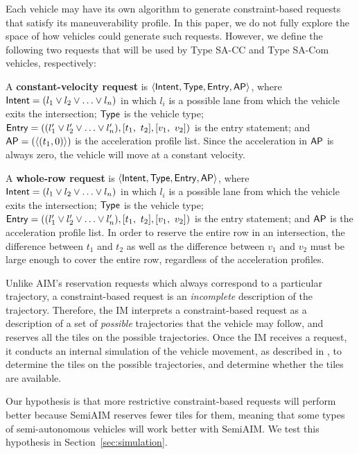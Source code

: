 Each vehicle may have its own algorithm to generate constraint-based
requests that satisfy its maneuverability profile.  In this paper, we
do not fully explore the space of how vehicles could generate such requests.
However, we define the following two requests that will be used by
Type SA-CC and Type SA-Com vehicles, respectively:

\begin{small_ind_s_itemize}
\item A \textbf{constant-velocity request}
is $\langle {\sf Intent}, {\sf Type}, {\sf Entry}, {\sf AP} \rangle$,
where
${\sf Intent} = ( l_1 \vee l_2 \vee \ldots \vee l_n )$
in which $l_i$ is a possible lane from which the vehicle 
exits the intersection;
${\sf Type}$ is the vehicle type;
${\sf Entry} = (( l'_1 \vee l'_2 \vee \ldots \vee l'_n ), [t_1,\ t_2], [v_1,\ v_2])$
is the entry statement; and
${\sf AP} = ( \langle (t_1, 0) \rangle )$
is the acceleration profile list.
Since the acceleration in ${\sf AP}$
is always zero, the vehicle will move at a constant velocity.

\item A \textbf{whole-row request}
is $\langle {\sf Intent}, {\sf Type}, {\sf Entry}, {\sf AP} \rangle$,
where
${\sf Intent} = ( l_1 \vee l_2 \vee \ldots \vee l_n )$
in which $l_i$ is a possible lane from which the vehicle 
exits the intersection;
${\sf Type}$ is the vehicle type;
${\sf Entry} = (( l'_1 \vee l'_2 \vee \ldots \vee l'_n ), [t_1,\ t_2], [v_1,\ v_2])$
is the entry statement; and
${\sf AP}$ is the acceleration profile list.
In order to reserve the entire row in an intersection,
the difference between $t_1$ and $t_2$ 
as well as the difference between $v_1$ and $v_2$
must be large enough to cover the entire row,
regardless of the acceleration profiles.
\end{small_ind_s_itemize}

Unlike AIM's reservation requests which always correspond to a
particular trajectory, a constraint-based request is an
\emph{incomplete} description of the trajectory.  Therefore, the IM
interprets a constraint-based request as a description of a set of
\emph{possible} trajectories that the vehicle may follow, and reserves
all the tiles on the possible trajectories.  Once the IM receives a
request, it conducts an internal simulation of the vehicle
movement, as described in \cite{bib:Dresner08Multiagent}, to determine
the tiles on the possible trajectories, and determine whether the
tiles are available.

Our hypothesis is that more restrictive constraint-based requests 
will perform better because SemiAIM reserves fewer tiles for them,
meaning that some types of semi-autonomous vehicles will work better
with SemiAIM.  We test this hypothesis in
Section~\ref{sec:simulation}.

